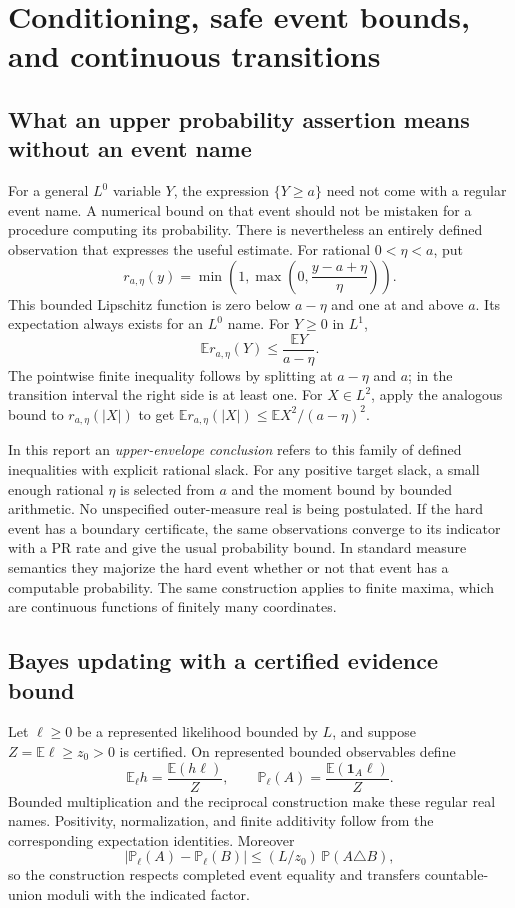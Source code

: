 \section{Conditioning, safe event bounds, and continuous transitions}
\label{sec:conditioning}

\subsection{What an upper probability assertion means without an event name}

For a general $L^0$ variable $Y$, the expression $\{Y\ge a\}$ need not
come with a regular event name. A numerical bound on that event should not
be mistaken for a procedure computing its probability. There is nevertheless
an entirely defined observation that expresses the useful estimate.
For rational $0<\eta<a$, put
\[
 r_{a,\eta}(y)
 =\min\left(1,\max\left(0,\frac{y-a+\eta}{\eta}\right)\right).
\]
This bounded Lipschitz function is zero below $a-\eta$ and one at and above
$a$. Its expectation always exists for an $L^0$ name. For $Y\ge0$ in $L^1$,
\[
 \mathbb E r_{a,\eta}(Y)\le\frac{\mathbb EY}{a-\eta}.
\]
The pointwise finite inequality follows by splitting at $a-\eta$ and $a$;
in the transition interval the right side is at least one. For $X\in L^2$,
apply the analogous bound to $r_{a,\eta}(|X|)$ to get
$\mathbb E r_{a,\eta}(|X|)\le\mathbb E X^2/(a-\eta)^2$.

In this report an \emph{upper-envelope conclusion} refers to this family of
defined inequalities with explicit rational slack. For any positive target
slack, a small enough rational $\eta$ is selected from $a$ and the moment
bound by bounded arithmetic. No unspecified outer-measure real is being
postulated. If the hard event has a boundary certificate, the same
observations converge to its indicator with a PR rate and give the usual
probability bound. In standard measure semantics they majorize the hard
event whether or not that event has a computable probability. The same
construction applies to finite maxima, which are continuous functions of
finitely many coordinates.

\subsection{Bayes updating with a certified evidence bound}

Let $\ell\ge0$ be a represented likelihood bounded by $L$, and suppose
$Z=\mathbb E\ell\ge z_0>0$ is certified. On represented bounded
observables define
\[
 \mathbb E_\ell h=\frac{\mathbb E(h\ell)}{Z},\qquad
 \mathbb P_\ell(A)=\frac{\mathbb E(\mathbf1_A\ell)}{Z}.
\]
Bounded multiplication and the reciprocal construction make these regular
real names. Positivity, normalization, and finite additivity follow from the
corresponding expectation identities. Moreover
\[
 |\mathbb P_\ell(A)-\mathbb P_\ell(B)|
 \le (L/z_0)\,\mathbb P(A\triangle B),
\]
so the construction respects completed event equality and transfers
countable-union moduli with the indicated factor.

